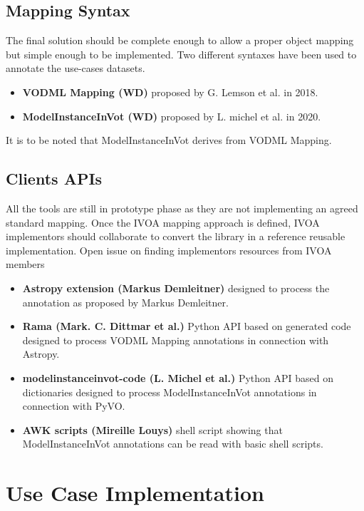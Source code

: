\documentclass[11pt,a4paper]{ivoa}
\begin{document}
\subsection{Mapping Syntax}

The final solution should be complete enough to
allow a proper object mapping but simple enough to be implemented. 
Two different syntaxes have been used to annotate the use-cases datasets.

\begin{itemize}
\item \textbf{VODML Mapping (WD)} proposed by G. Lemson et al. in 2018.
\item \textbf{ModelInstanceInVot (WD)} proposed by L. michel et al. in 2020.
\end{itemize}

It is to be noted that ModelInstanceInVot derives from VODML Mapping.

\subsection{Clients APIs}

All the tools are still in prototype phase as they are not implementing
an agreed standard mapping. Once the IVOA mapping  approach is defined, IVOA implementors should 
collaborate to convert the library in a reference reusable implementation. Open issue on finding implementors
resources from IVOA members

\begin{itemize}
\item \textbf{Astropy extension (Markus Demleitner)}  designed to process the annotation as proposed by Markus Demleitner.
\item \textbf{Rama (Mark. C. Dittmar et al.)} Python API based on generated code designed to process  VODML Mapping annotations in connection with Astropy.
\item \textbf{modelinstanceinvot-code (L. Michel et al.)} Python API based on dictionaries designed to process ModelInstanceInVot annotations in connection with PyVO.
\item \textbf{AWK scripts (Mireille Louys)} shell script showing that ModelInstanceInVot annotations  can be read with basic shell scripts.
\end{itemize}


\section{Use Case Implementation}
\end{document}
